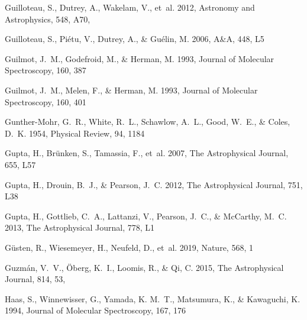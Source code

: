 \documentclass[twocolumn]{aastex631}
\begin{document}
\begin{thebibliography}{}
{Guilloteau}, S., {Dutrey}, A., {Wakelam}, V., {et~al.} 2012, Astronomy and
  Astrophysics, 548, A70, 

Guilloteau, S., Pi{\'e}tu, V., Dutrey, A., \& Gu{\'e}lin, M. 2006, A{\&}A, 448,
  L5

Guilmot, J.~M., Godefroid, M., \& Herman, M. 1993{}, Journal of
  Molecular Spectroscopy, 160, 387

Guilmot, J.~M., Melen, F., \& Herman, M. 1993{}, Journal of
  Molecular Spectroscopy, 160, 401

Gunther-Mohr, G.~R., White, R.~L., Schawlow, A.~L., Good, W.~E., \& Coles,
  D.~K. 1954, Physical Review, 94, 1184

Gupta, H., Br{\"u}nken, S., Tamassia, F., {et~al.} 2007, The Astrophysical
  Journal, 655, L57

Gupta, H., Drouin, B.~J., \& Pearson, J.~C. 2012, The Astrophysical Journal,
  751, L38

Gupta, H., Gottlieb, C.~A., Lattanzi, V., Pearson, J.~C., \& McCarthy, M.~C.
  2013, The Astrophysical Journal, 778, L1

G{\"u}sten, R., Wiesemeyer, H., Neufeld, D., {et~al.} 2019, Nature, 568, 1

{Guzm{\'a}n}, V.~V., {{\"O}berg}, K.~I., {Loomis}, R., \& {Qi}, C. 2015, The
  Astrophysical Journal, 814, 53, 

Haas, S., Winnewisser, G., Yamada, K. M.~T., Matsumura, K., \& Kawaguchi, K.
  1994, Journal of Molecular Spectroscopy, 167, 176


\end{thebibliography}
\end{document}
